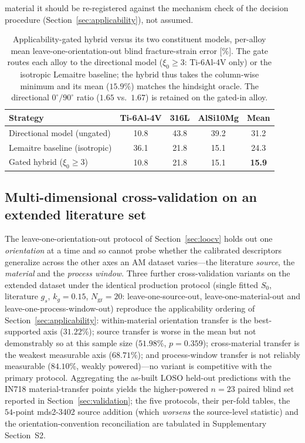 material it should be re-registered against the mechanism check of the decision procedure (Section~\ref{sec:applicability}), not assumed.

\begin{table}[htbp]
\centering
\caption{Applicability-gated hybrid versus its two constituent models, per-alloy mean leave-one-orientation-out blind fracture-strain error [\%]. The gate routes each alloy to the directional model ($\xi_0\ge3$: Ti-6Al-4V only) or the isotropic Lemaitre baseline; the hybrid thus takes the column-wise minimum and its mean ($15.9\%$) matches the hindsight oracle. The directional $0^\circ/90^\circ$ ratio ($1.65$ vs.\ $1.67$) is retained on the gated-in alloy.}
\label{tab:gate}
\footnotesize
\setlength{\tabcolsep}{4pt}
\begin{tabular}{lcccc}
\toprule
\textbf{Strategy} & Ti-6Al-4V & 316L & AlSi10Mg & \textbf{Mean} \\
\midrule
Directional model (ungated) & 10.8 & 43.8 & 39.2 & 31.2 \\
Lemaitre baseline (isotropic) & 36.1 & 21.8 & 15.1 & 24.3 \\
\midrule
Gated hybrid ($\xi_0\ge3$) & 10.8 & 21.8 & 15.1 & \textbf{15.9} \\
\bottomrule
\end{tabular}
\end{table}

\subsection{Multi-dimensional cross-validation on an extended literature set}
\label{sec:multidim_cv}

The leave-one-orientation-out protocol of Section~\ref{sec:loocv} holds out one \emph{orientation} at a time and so cannot probe whether the calibrated descriptors generalize across the other axes an AM dataset varies---the literature \emph{source}, the \emph{material} and the \emph{process window}. Three further cross-validation variants on the extended dataset under the identical production protocol (single fitted $S_0$, literature $g_s$, $k_g = 0.15$, $N_{\mathrm{gr}} = 20$: leave-one-source-out, leave-one-material-out and leave-one-process-window-out) reproduce the applicability ordering of Section~\ref{sec:applicability}: within-material orientation transfer is the best-supported axis ($31.22\%$); source transfer is worse in the mean but not demonstrably so at this sample size ($51.98\%$, $p = 0.359$); cross-material transfer is the weakest measurable axis ($68.71\%$); and process-window transfer is not reliably measurable ($84.10\%$, weakly powered)---no variant is competitive with the primary protocol. Aggregating the as-built LOSO held-out predictions with the IN718 material-transfer points yields the higher-powered $n = 23$ paired blind set reported in Section~\ref{sec:validation}; the five protocols, their per-fold tables, the $54$-point mds2-3402 source addition (which \emph{worsens} the source-level statistic) and the orientation-convention reconciliation are tabulated in Supplementary Section~S2.


